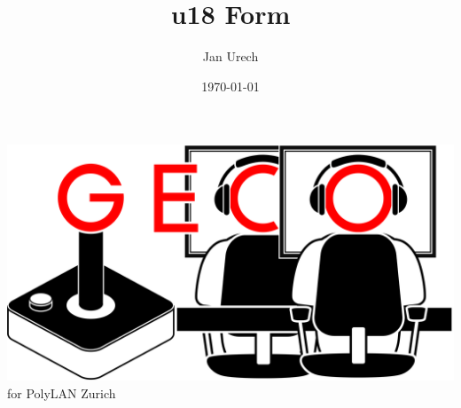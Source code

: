 \documentclass{article}
\title{u18 Form}
\author{Jan Urech}
\date{\today}
\begin{document}
\makeatletter
\includegraphics[scale=0.0255]{img/GECo.png}  
\hspace{0.5cm}
\LARGE \@title  
\hspace{0.1cm}
for PolyLAN Zurich\\ \normalsize
\vspace{0.5cm}
\raggedright
\end{document}
